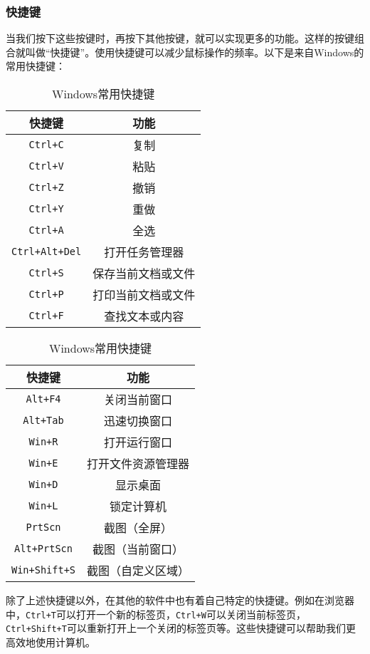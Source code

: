 \subsubsection{快捷键}

当我们按下这些按键时，再按下其他按键，就可以实现更多的功能。这样的按键组合就叫做“快捷键”。使用快捷键可以减少鼠标操作的频率。以下是来自Windows的常用快捷键：

\begin{table}[ht]
  \centering
  \caption{Windows常用快捷键}
  \label{tab:windows-shortcuts}
  \begin{tabular}[t]{c|c}
    \hline
    \textbf{快捷键} & \textbf{功能} \\
    \hline
    \texttt{Ctrl+C} & 复制 \\
    \texttt{Ctrl+V} & 粘贴 \\
    \texttt{Ctrl+Z} & 撤销 \\
    \texttt{Ctrl+Y} & 重做 \\
    \texttt{Ctrl+A} & 全选 \\
    \texttt{Ctrl+Alt+Del} & 打开任务管理器 \\
    \texttt{Ctrl+S} & 保存当前文档或文件 \\
    \texttt{Ctrl+P} & 打印当前文档或文件 \\
    \texttt{Ctrl+F} & 查找文本或内容 \\
    \hline
  \end{tabular}
  \qquad
  \begin{tabular}[t]{c|c}
    \hline
    \textbf{快捷键} & \textbf{功能} \\
    \hline
    \texttt{Alt+F4} & 关闭当前窗口 \\
    \texttt{Alt+Tab} & 迅速切换窗口 \\
    \texttt{Win+R} & 打开运行窗口 \\
    \texttt{Win+E} & 打开文件资源管理器 \\
    \texttt{Win+D} & 显示桌面 \\
    \texttt{Win+L} & 锁定计算机 \\
    \texttt{PrtScn} & 截图（全屏） \\
    \texttt{Alt+PrtScn} & 截图（当前窗口） \\
    \texttt{Win+Shift+S} & 截图（自定义区域） \\
    \hline
  \end{tabular}
\end{table}

除了上述快捷键以外，在其他的软件中也有着自己特定的快捷键。例如在浏览器中，\texttt{Ctrl+T}可以打开一个新的标签页，\texttt{Ctrl+W}可以关闭当前标签页，\texttt{Ctrl+Shift+T}可以重新打开上一个关闭的标签页等。这些快捷键可以帮助我们更高效地使用计算机。

